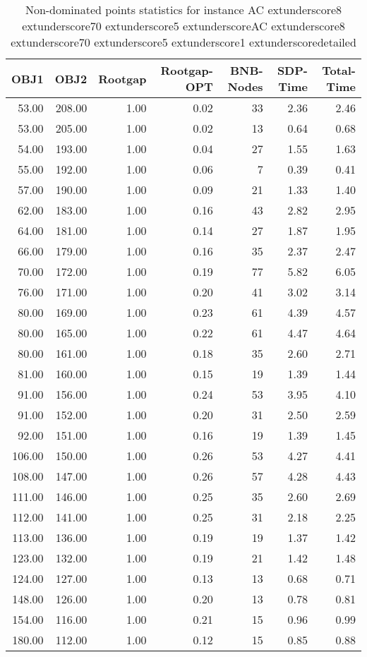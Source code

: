 \begin{table}
\caption{Non-dominated points statistics for instance AC	extunderscore8	extunderscore70	extunderscore5	extunderscoreAC	extunderscore8	extunderscore70	extunderscore5	extunderscore1	extunderscoredetailed}
\label{tab:stats/AC_8_70_5_AC_8_70_5_1_detailed}
\begin{tabular}{rrrrrrr}
\toprule
OBJ1 & OBJ2 & Rootgap & Rootgap-OPT & BNB-Nodes & SDP-Time & Total-Time \\
\midrule
53.00 & 208.00 & 1.00 & 0.02 & 33 & 2.36 & 2.46 \\
53.00 & 205.00 & 1.00 & 0.02 & 13 & 0.64 & 0.68 \\
54.00 & 193.00 & 1.00 & 0.04 & 27 & 1.55 & 1.63 \\
55.00 & 192.00 & 1.00 & 0.06 & 7 & 0.39 & 0.41 \\
57.00 & 190.00 & 1.00 & 0.09 & 21 & 1.33 & 1.40 \\
62.00 & 183.00 & 1.00 & 0.16 & 43 & 2.82 & 2.95 \\
64.00 & 181.00 & 1.00 & 0.14 & 27 & 1.87 & 1.95 \\
66.00 & 179.00 & 1.00 & 0.16 & 35 & 2.37 & 2.47 \\
70.00 & 172.00 & 1.00 & 0.19 & 77 & 5.82 & 6.05 \\
76.00 & 171.00 & 1.00 & 0.20 & 41 & 3.02 & 3.14 \\
80.00 & 169.00 & 1.00 & 0.23 & 61 & 4.39 & 4.57 \\
80.00 & 165.00 & 1.00 & 0.22 & 61 & 4.47 & 4.64 \\
80.00 & 161.00 & 1.00 & 0.18 & 35 & 2.60 & 2.71 \\
81.00 & 160.00 & 1.00 & 0.15 & 19 & 1.39 & 1.44 \\
91.00 & 156.00 & 1.00 & 0.24 & 53 & 3.95 & 4.10 \\
91.00 & 152.00 & 1.00 & 0.20 & 31 & 2.50 & 2.59 \\
92.00 & 151.00 & 1.00 & 0.16 & 19 & 1.39 & 1.45 \\
106.00 & 150.00 & 1.00 & 0.26 & 53 & 4.27 & 4.41 \\
108.00 & 147.00 & 1.00 & 0.26 & 57 & 4.28 & 4.43 \\
111.00 & 146.00 & 1.00 & 0.25 & 35 & 2.60 & 2.69 \\
112.00 & 141.00 & 1.00 & 0.25 & 31 & 2.18 & 2.25 \\
113.00 & 136.00 & 1.00 & 0.19 & 19 & 1.37 & 1.42 \\
123.00 & 132.00 & 1.00 & 0.19 & 21 & 1.42 & 1.48 \\
124.00 & 127.00 & 1.00 & 0.13 & 13 & 0.68 & 0.71 \\
148.00 & 126.00 & 1.00 & 0.20 & 13 & 0.78 & 0.81 \\
154.00 & 116.00 & 1.00 & 0.21 & 15 & 0.96 & 0.99 \\
180.00 & 112.00 & 1.00 & 0.12 & 15 & 0.85 & 0.88 \\
\bottomrule
\end{tabular}
\end{table}
